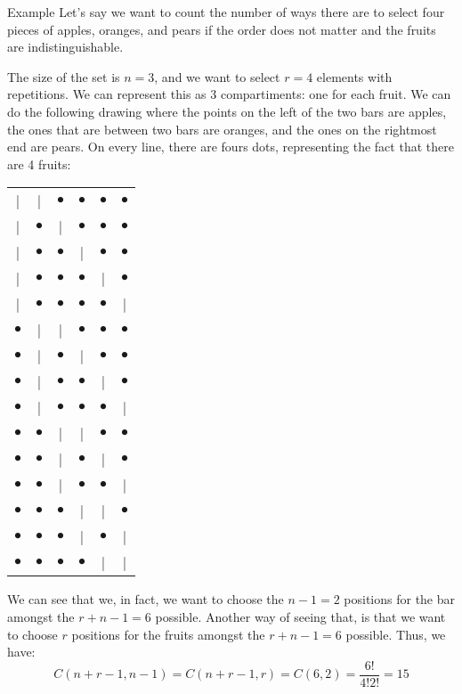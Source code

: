 \documentclass[a4paper]{article}
\begin{document}
\begin{parag}{Example}
    Let's say we want to count the number of ways there are to select four pieces of apples, oranges, and pears if the order does not matter and the fruits are indistinguishable.

    The size of the set is $n = 3$, and we want to select $r = 4$ elements with repetitions. We can represent this as 3 compartiments: one for each fruit. We can do the following drawing where the points on the left of the two bars are apples, the ones that are between two bars are oranges, and the ones on the rightmost end are pears. On every line, there are fours dots, representing the fact that there are 4 fruits: 

    \begin{center}
    \begin{tabular}{cccccc}
        | & | & $\bullet$ & $\bullet$ & $\bullet$ & $\bullet$ \\
        | & $\bullet$ & | & $\bullet$ & $\bullet$ & $\bullet$ \\
        | & $\bullet$ & $\bullet$ & | & $\bullet$ & $\bullet$ \\
        | & $\bullet$ & $\bullet$ & $\bullet$ & | & $\bullet$ \\
        | & $\bullet$ & $\bullet$ & $\bullet$ & $\bullet$ & | \\
        $\bullet$ & | & | & $\bullet$ & $\bullet$ & $\bullet$ \\
        $\bullet$ & | & $\bullet$ & | & $\bullet$ & $\bullet$ \\
        $\bullet$ & | & $\bullet$ & $\bullet$ & | & $\bullet$ \\
        $\bullet$ & | & $\bullet$ & $\bullet$ & $\bullet$ & | \\
        $\bullet$ & $\bullet$ & | & | & $\bullet$ & $\bullet$ \\
        $\bullet$ & $\bullet$ & | & $\bullet$ & | & $\bullet$ \\
        $\bullet$ & $\bullet$ & | & $\bullet$ & $\bullet$ & | \\
        $\bullet$ & $\bullet$ & $\bullet$ & | & | & $\bullet$ \\
        $\bullet$ & $\bullet$ & $\bullet$ & | & $\bullet$ & | \\
        $\bullet$ & $\bullet$ & $\bullet$ & $\bullet$ & | & | \\
    \end{tabular}
    \end{center}
    

    We can see that we, in fact, we want to choose the $n - 1 = 2$ positions for the bar amongst the $r + n - 1 = 6$ possible. Another way of seeing that, is that we want to choose $r$ positions for the fruits amongst the $r + n - 1 = 6$ possible. Thus, we have: 
    \[C\left(n + r - 1, n - 1\right) = C\left(n + r - 1, r\right) = C\left(6, 2\right) = \frac{6!}{4!2!} = 15\]
\end{parag}
\end{document}
